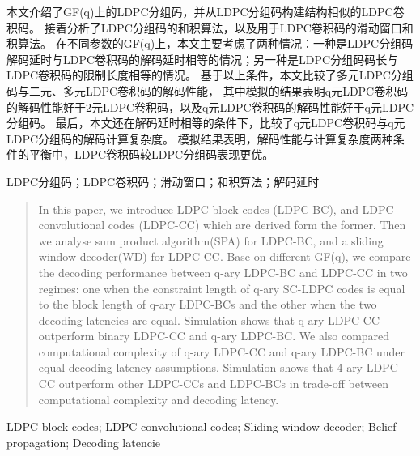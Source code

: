 

\begin{zhaiyao}
本文介绍了GF(q)上的LDPC分组码，并从LDPC分组码构建结构相似的LDPC卷积码。
接着分析了LDPC分组码的和积算法，以及用于LDPC卷积码的滑动窗口和积算法。
在不同参数的GF(q)上，本文主要考虑了两种情况：一种是LDPC分组码解码延时与LDPC卷积码的解码延时相等的情况；另一种是LDPC分组码码长与LDPC卷积码的限制长度相等的情况。
基于以上条件，本文比较了多元LDPC分组码与二元、多元LDPC卷积码的解码性能，
其中模拟的结果表明q元LDPC卷积码的解码性能好于2元LDPC卷积码，以及q元LDPC卷积码的解码性能好于q元LDPC分组码。
最后，本文还在解码延时相等的条件下，比较了q元LDPC卷积码与q元LDPC分组码的解码计算复杂度。
模拟结果表明，解码性能与计算复杂度两种条件的平衡中，LDPC卷积码较LDPC分组码表现更优。
\newline

\end{zhaiyao}


\begin{guanjianci}
LDPC分组码；LDPC卷积码；滑动窗口；和积算法；解码延时
\end{guanjianci}



\begin{abstract}
In this paper, we introduce LDPC block codes (LDPC-BC), and LDPC convolutional codes (LDPC-CC) which are derived form the former. Then we analyse sum product algorithm(SPA) for LDPC-BC, and a sliding window decoder(WD) for LDPC-CC. Base on different GF(q), we compare the decoding performance between q-ary LDPC-BC and LDPC-CC in two regimes: one when the constraint length of q-ary SC-LDPC codes is equal to the block length of q-ary LDPC-BCs and the other when the two decoding latencies are equal. Simulation shows that q-ary LDPC-CC outperform binary LDPC-CC and q-ary LDPC-BC.
We also compared computational complexity of q-ary LDPC-CC and q-ary LDPC-BC under equal decoding latency assumptions.
Simulation shows that 4-ary LDPC-CC outperform other LDPC-CCs and LDPC-BCs in trade-off between computational complexity and decoding latency.
\newline

\end{abstract}


\begin{keywords}
LDPC block codes; LDPC convolutional codes; Sliding window decoder; Belief propagation; Decoding latencie
\end{keywords} 